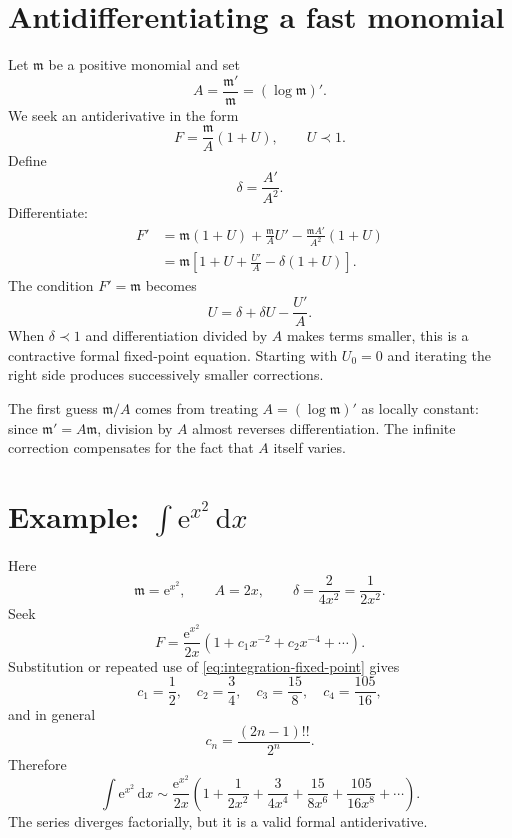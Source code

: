\documentclass[11pt,openany]{book}
\theoremstyle{definition}
\theoremstyle{plain}
\theoremstyle{remark}
\newcommand{\m}{\mathfrak{m}}
\newcommand{\dd}{\,\mathrm{d}}
\newcommand{\e}{\mathrm{e}}
\newcommand{\asym}{\sim}
\newcommand{\precdom}{\prec}
\begin{document}
\section{Antidifferentiating a fast monomial}

Let $\m$ be a positive monomial and set
\[
 A=\frac{\m'}{\m}=(\log\m)'.
\]
We seek an antiderivative in the form
\begin{equation}\label{eq:integral-ansatz}
 F=\frac{\m}{A}(1+U),
 \qquad U\precdom1.
\end{equation}
Define
\[
 \delta=\frac{A'}{A^2}.
\]
Differentiate:
\begin{align*}
 F'
 &=\m(1+U)+\frac{\m}{A}U'
   -\frac{\m A'}{A^2}(1+U)\\
 &=\m\left[1+U+\frac{U'}A-\delta(1+U)\right].
\end{align*}
The condition $F'=\m$ becomes
\begin{equation}\label{eq:integration-fixed-point}
 U=\delta+\delta U-\frac{U'}A.
\end{equation}
When $\delta\precdom1$ and differentiation divided by $A$ makes terms smaller, this is a contractive formal fixed-point equation. Starting with $U_0=0$ and iterating the right side produces successively smaller corrections.

\begin{intuitionbox}
The first guess $\m/A$ comes from treating $A=(\log\m)'$ as locally constant: since $\m'=A\m$, division by $A$ almost reverses differentiation. The infinite correction compensates for the fact that $A$ itself varies.
\end{intuitionbox}

\section{Example: $\int\e^{x^2}\dd x$}

Here
\[
 \m=\e^{x^2},
 \qquad A=2x,
 \qquad \delta=\frac{2}{4x^2}=\frac1{2x^2}.
\]
Seek
\[
 F=\frac{\e^{x^2}}{2x}
 \left(1+c_1x^{-2}+c_2x^{-4}+\cdots\right).
\]
Substitution or repeated use of \cref{eq:integration-fixed-point} gives
\[
 c_1=\frac12,
 \quad c_2=\frac34,
 \quad c_3=\frac{15}{8},
 \quad c_4=\frac{105}{16},
\]
and in general
\[
 c_n=\frac{(2n-1)!!}{2^n}.
\]
Therefore
\begin{equation}\label{eq:int-exp-x2}
 \int\e^{x^2}\dd x
 \asym\frac{\e^{x^2}}{2x}
 \left(1+\frac1{2x^2}+\frac3{4x^4}
 +\frac{15}{8x^6}+\frac{105}{16x^8}+\cdots\right).
\end{equation}
The series diverges factorially, but it is a valid formal antiderivative.
\end{document}
